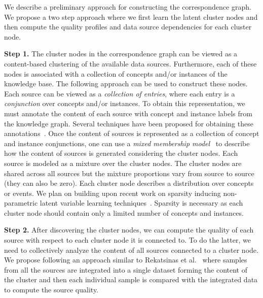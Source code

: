 \documentclass{sig-alternate}
\begin{document}
We describe a preliminary approach for constructing the correspondence graph. We propose a two step approach where we first learn the latent cluster nodes and then compute the quality profiles and data source dependencies for each cluster node. 

\vspace{3pt} \noindent\textbf{Step 1.} The cluster nodes in the correspondence graph can be viewed as a content-based clustering of the available data sources. Furthermore, each of these nodes is associated with a collection of concepts and/or instances of the knowledge base. The following approach can be used to construct these nodes. Each source can be viewed as a {\em collection of entries}, where each entry is a {\em conjunction} over concepts and/or instances. To obtain this representation, we must annotate the content of each source with concept and instance labels from the knowledge graph. Several techniques have been proposed for obtaining these annotations~\cite{spotlight,limaye:2010}. Once the content of sources is represented as a collection of concept and instance conjunctions, one can use a {\em mixed membership model}~\cite{blei:2003} to describe how the content of sources is generated considering the cluster nodes. Each source is modeled as a mixture over the cluster nodes. The cluster nodes are shared across all sources but the mixture proportions vary from source to source (they can also be zero). Each cluster node describes a distribution over concepts or events. We plan on building upon recent work on sparsity inducing non-parametric latent variable learning techniques~\cite{elidan:2005, sdm:2013}. Sparsity is necessary as each cluster node should contain only a limited number of concepts and instances. 

\vspace{3pt} \noindent\textbf{Step 2.} After discovering the cluster nodes, we can compute the quality of each source with respect to each cluster node it is connected to. To do the latter, we need to collectively analyze the content of all sources connected to a cluster node. We propose following an approach similar to Rekatsinas et al.~\cite{rekatsinas:2014} where samples from all the sources are integrated into a single dataset forming the content of the cluster and then each individual sample is compared with the integrated data to compute the source quality. 
\end{document}
